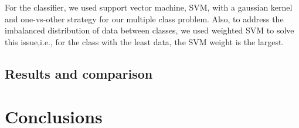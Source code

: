 \documentclass[conference]{IEEEtran}
\begin{document}
For the classifier, we used support vector machine, SVM, with a gaussian kernel and one-vs-other strategy for our multiple class problem. Also, to address the imbalanced distribution of data between classes, we used weighted SVM to solve this issue,i.e., for the class with the least data, the SVM weight is the largest.





\subsection{\textbf{Results and comparison}}
\vspace{1cm}
\section{Conclusions}
\vspace{1cm}











\vspace{12pt}
\end{document}
